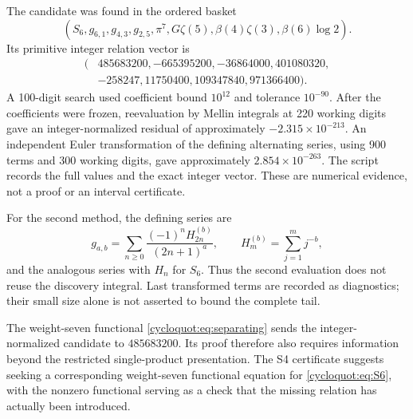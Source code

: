 The candidate was found in the ordered basket
\[
 (S_6,g_{6,1},g_{4,3},g_{2,5},\pi^7,
          G\zeta(5),\beta(4)\zeta(3),\beta(6)\log2).
\]
Its primitive integer relation vector is
\[
 \begin{split}
 (&485683200,-665395200,-36864000,401080320,\\
  &-258247,11750400,109347840,971366400).
 \end{split}
\]
A 100-digit search used coefficient bound \(10^{12}\) and tolerance
\(10^{-90}\). After the coefficients were frozen, reevaluation by
Mellin integrals at 220 working digits gave an integer-normalized
residual of approximately \(-2.315\times10^{-213}\).
An independent Euler transformation of the defining alternating
series, using 900 terms and 300 working digits, gave approximately
\(2.854\times10^{-263}\). The script records the full values and
the exact integer vector. These are numerical evidence, not a proof
or an interval certificate.

For the second method, the defining series are
\[
 g_{a,b}=\sum_{n\geq0}
       \frac{(-1)^nH_{2n}^{(b)}}{(2n+1)^a},
 \qquad H_m^{(b)}=\sum_{j=1}^{m}j^{-b},
\]
and the analogous series with \(H_n\) for \(S_6\).
Thus the second evaluation does not reuse the discovery integral.
Last transformed terms are recorded as diagnostics; their small
size alone is not asserted to bound the complete tail.

The weight-seven functional \eqref{cycloquot:eq:separating} sends the
integer-normalized candidate to \(485683200\). Its proof therefore
also requires information beyond the restricted single-product
presentation. The S4 certificate suggests seeking a corresponding weight-seven functional equation
for \eqref{cycloquot:eq:S6}, with the
nonzero functional serving as a check that the missing relation has
actually been introduced.



